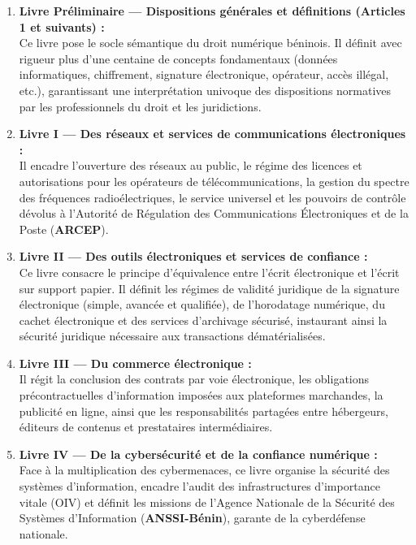 \begin{enumerate}
    \item \textbf{Livre Préliminaire — Dispositions générales et définitions (Articles 1 et suivants) :} \\
    Ce livre pose le socle sémantique du droit numérique béninois. Il définit avec rigueur plus d'une centaine de concepts fondamentaux (données informatiques, chiffrement, signature électronique, opérateur, accès illégal, etc.), garantissant une interprétation univoque des dispositions normatives par les professionnels du droit et les juridictions.

    \item \textbf{Livre I — Des réseaux et services de communications électroniques :} \\
    Il encadre l'ouverture des réseaux au public, le régime des licences et autorisations pour les opérateurs de télécommunications, la gestion du spectre des fréquences radioélectriques, le service universel et les pouvoirs de contrôle dévolus à l'Autorité de Régulation des Communications Électroniques et de la Poste (\textbf{ARCEP}).

    \item \textbf{Livre II — Des outils électroniques et services de confiance :} \\
    Ce livre consacre le principe d'équivalence entre l'écrit électronique et l'écrit sur support papier. Il définit les régimes de validité juridique de la signature électronique (simple, avancée et qualifiée), de l'horodatage numérique, du cachet électronique et des services d'archivage sécurisé, instaurant ainsi la sécurité juridique nécessaire aux transactions dématérialisées.

    \item \textbf{Livre III — Du commerce électronique :} \\
    Il régit la conclusion des contrats par voie électronique, les obligations précontractuelles d'information imposées aux plateformes marchandes, la publicité en ligne, ainsi que les responsabilités partagées entre hébergeurs, éditeurs de contenus et prestataires intermédiaires.

    \item \textbf{Livre IV — De la cybersécurité et de la confiance numérique :} \\
    Face à la multiplication des cybermenaces, ce livre organise la sécurité des systèmes d'information, encadre l'audit des infrastructures d'importance vitale (OIV) et définit les missions de l'Agence Nationale de la Sécurité des Systèmes d'Information (\textbf{ANSSI-Bénin}), garante de la cyberdéfense nationale.


\end{enumerate}
